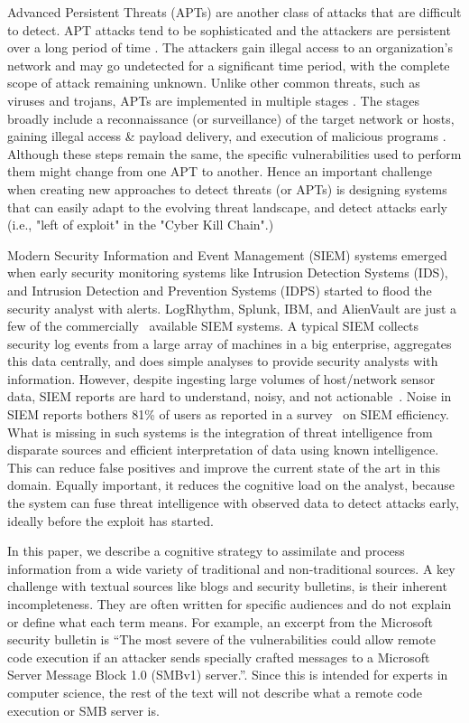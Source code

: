 Advanced Persistent Threats (APTs) are another class of attacks that are difficult to detect.
APT attacks tend to be sophisticated and the attackers are persistent over a long period of time \cite{li2011detailed}\cite{sood2013targeted}. The attackers gain illegal access to an organization's network and may go undetected for a significant time period, with the complete scope of attack remaining unknown. Unlike other common threats, such as viruses and trojans, APTs are implemented in multiple stages \cite{sood2013targeted}. The stages broadly include a reconnaissance (or surveillance) of the target network or hosts, gaining illegal access \& payload delivery, and execution of malicious programs \cite{bhatt2014towards}. Although these steps remain the same, the specific vulnerabilities used to perform them might change from one APT to another. Hence an important challenge when creating new approaches to detect threats (or APTs) is designing systems that can easily adapt to the evolving threat landscape, and detect attacks early (i.e., "left of exploit" in the "Cyber Kill Chain".) 

Modern Security Information and Event Management (SIEM) systems emerged when early security monitoring systems like Intrusion Detection Systems (IDS), and Intrusion Detection and Prevention Systems (IDPS) started to flood the security analyst with alerts. LogRhythm, Splunk, IBM, and AlienVault are just a few of the commercially~\cite{gartnersiem} available SIEM systems. A typical SIEM collects security log events from a large array of machines in a big enterprise, aggregates this data centrally, and does simple analyses to provide security analysts with information. However, despite ingesting large volumes of host/network sensor data, SIEM reports are hard to understand, noisy, and not actionable~\cite{netwrixlimits}. Noise in SIEM reports bothers 81\% of users as reported in a survey~\cite{netwrixinfo} on SIEM efficiency.  What is missing in such systems is the integration of threat intelligence from disparate sources and efficient interpretation of data using known intelligence. This can reduce false positives and improve the current state of the art in this domain. Equally important, it reduces the cognitive load on the analyst, because the system can fuse threat intelligence with observed data to detect attacks early, ideally before the exploit has started.

In this paper, we describe a cognitive strategy to assimilate and process information from a wide variety of traditional and non-traditional sources. 
A key challenge with textual sources like blogs and security bulletins, is their inherent incompleteness. They are often written for specific audiences and do not explain or define what each term means. For example, an excerpt from the Microsoft security bulletin is ``The most severe of the vulnerabilities could allow remote code execution if an attacker sends specially crafted messages to a Microsoft Server Message Block 1.0 (SMBv1) server.''. Since this is intended for experts in computer science, the rest of the text will not describe what a remote code execution or SMB server is.

